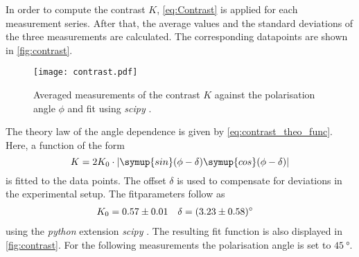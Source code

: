In order to compute the contrast $K$, \autoref{eq:Contrast} is applied for each measurement series. After that, the average values and the standard deviations of the three measurements are calculated. The corresponding datapoints are shown in 
\autoref{fig:contrast}. 
\begin{figure}
  \centering
  \texttt{[image: contrast.pdf]}
  \caption{Averaged measurements of the contrast $K$ against the polarisation angle $\phi$ and fit using \textit{scipy} \cite{scipy}.}
  \label{fig:contrast}
\end{figure}
The theory law of the angle dependence is given by \autoref{eq:contrast_theo_func}. Here, a function of the form 
\begin{equation*}
  K = 2K_0 \cdot \lvert \symup{sin}(\phi - \delta)\symup{cos}(\phi - \delta) \rvert
\end{equation*}
is fitted to the data points. The offset $\delta$ is used to compensate for deviations in the experimental setup. 
The fitparameters follow as 
\begin{align*}
  K_0 &= \num{0.57 +- 0.01} & \delta &= \qty{3.23 +- 0.58}{\degree}
\end{align*}
using the \textit{python} extension \textit{scipy} \cite{scipy}. The resulting fit function is also displayed in \autoref{fig:contrast}.
For the following measurements the polarisation angle is set to $\qty{45}{\degree}$.

